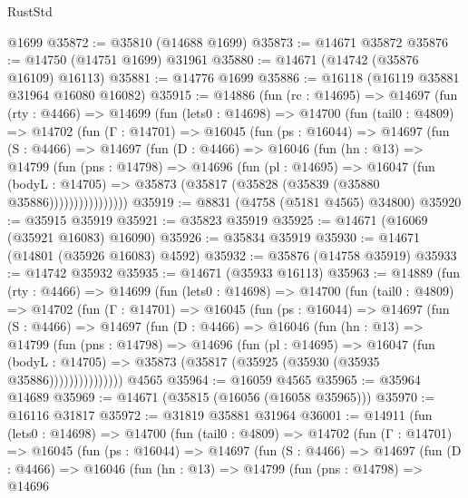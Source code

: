 \begin{lexlean}{RustStd}
\begin{coremodule}
    @1699
@35872 := @35810 (@14688 @1699)
@35873 := @14671 @35872
@35876 := @14750 (@14751 @1699) @31961
@35880 := @14671 (@14742 (@35876 @16109) @16113)
@35881 := @14776 @1699
@35886 := @16118 (@16119 @35881 @31964 @16080 @16082)
@35915 := @14886
    (fun (rc : @14695) =>
    @14697
      (fun (rty : @4466) =>
      @14699
        (fun (lets0 : @14698) =>
        @14700
          (fun (tail0 : @4809) =>
          @14702
            (fun (Γ : @14701) =>
            @16045
              (fun (ps : @16044) =>
              @14697
                (fun (S : @4466) =>
                @14697
                  (fun (D : @4466) =>
                  @16046
                    (fun (hn : @13) =>
                    @14799
                      (fun (pns : @14798) =>
                      @14696
                        (fun (pl : @14695) =>
                        @16047
                          (fun (bodyL : @14705) =>
                          @35873 (@35817 (@35828 (@35839 (@35880 @35886))))))))))))))))
@35919 := @8831 (@4758 (@5181 @4565) @34800)
@35920 := @35915 @35919
@35921 := @35823 @35919
@35925 := @14671 (@16069 (@35921 @16083) @16090)
@35926 := @35834 @35919
@35930 := @14671 (@14801 (@35926 @16083) @4592)
@35932 := @35876 (@14758 @35919)
@35933 := @14742 @35932
@35935 := @14671 (@35933 @16113)
@35963 := @14889
    (fun (rty : @4466) =>
    @14699
      (fun (lets0 : @14698) =>
      @14700
        (fun (tail0 : @4809) =>
        @14702
          (fun (Γ : @14701) =>
          @16045
            (fun (ps : @16044) =>
            @14697
              (fun (S : @4466) =>
              @14697
                (fun (D : @4466) =>
                @16046
                  (fun (hn : @13) =>
                  @14799
                    (fun (pns : @14798) =>
                    @14696
                      (fun (pl : @14695) =>
                      @16047
                        (fun (bodyL : @14705) =>
                        @35873 (@35817 (@35925 (@35930 (@35935 @35886)))))))))))))))
    @4565
@35964 := @16059 @4565
@35965 := @35964 @14689
@35969 := @14671 (@35815 (@16056 (@16058 @35965)))
@35970 := @16116 @31817
@35972 := @31819 @35881 @31964
@36001 := @14911
    (fun (lets0 : @14698) =>
    @14700
      (fun (tail0 : @4809) =>
      @14702
        (fun (Γ : @14701) =>
        @16045
          (fun (ps : @16044) =>
          @14697
            (fun (S : @4466) =>
            @14697
              (fun (D : @4466) =>
              @16046
                (fun (hn : @13) =>
                @14799
                  (fun (pns : @14798) =>
                  @14696

\end{coremodule}
\end{lexlean}
